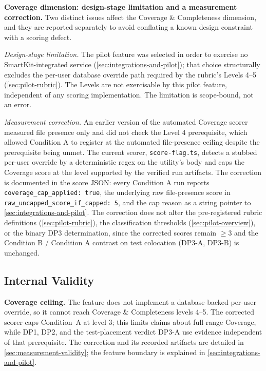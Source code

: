 \documentclass[12pt,a4paper]{report}
\begin{document}
\textbf{Coverage dimension: design-stage limitation and a measurement correction.}
Two distinct issues affect the Coverage \& Completeness dimension, and they are reported separately to avoid conflating a known design constraint with a scoring defect.

\textit{Design-stage limitation.} The pilot feature was selected in order to exercise no SmartKit-integrated service (\autoref{sec:integrations-and-pilot}); that choice structurally excludes the per-user database override path required by the rubric's Levels 4--5 (\autoref{sec:pilot-rubric}). The Levels are not exercisable by this pilot feature, independent of any scoring implementation. The limitation is scope-bound, not an error.

\textit{Measurement correction.} An earlier version of the automated Coverage scorer measured file presence only and did not check the Level 4 prerequisite, which allowed Condition A to register at the automated file-presence ceiling despite the prerequisite being unmet. The current scorer, \texttt{score-flag.ts}, detects a stubbed per-user override by a deterministic regex on the utility's body and caps the Coverage score at the level supported by the verified run artifacts. The correction is documented in the score JSON: every Condition A run reports \texttt{coverage\_cap\_applied: true}, the underlying raw file-presence score in \texttt{raw\_uncapped\_score\_if\_capped: 5}, and the cap reason as a string pointer to \autoref{sec:integrations-and-pilot}. The correction does not alter the pre-registered rubric definitions (\autoref{sec:pilot-rubric}), the classification thresholds (\autoref{sec:pilot-overview}), or the binary DP3 determination, since the corrected scores remain $\geq 3$ and the Condition B / Condition A contrast on test colocation (DP3-A, DP3-B) is unchanged.

\subsection{Internal Validity}
\label{sec:internal-validity}

\textbf{Coverage ceiling.} The feature does not implement a database-backed per-user override, so it cannot reach Coverage \& Completeness levels 4--5. The corrected scorer caps Condition~A at level 3; this limits claims about full-range Coverage, while DP1, DP2, and the test-placement verdict DP3-A use evidence independent of that prerequisite. The correction and its recorded artifacts are detailed in \autoref{sec:measurement-validity}; the feature boundary is explained in \autoref{sec:integrations-and-pilot}.
\end{document}
